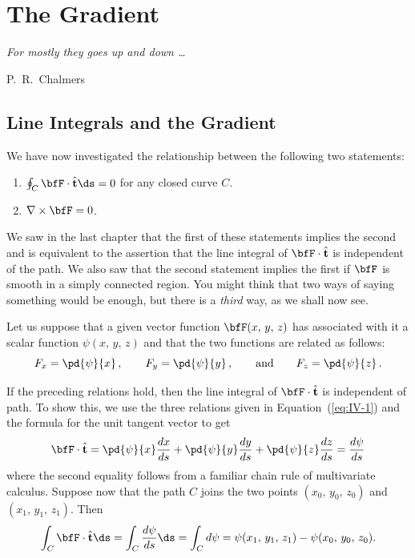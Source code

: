 \chapter{The Gradient}

\epigraph{\textit{For mostly they goes up and down \ldots}}{P.~R.~Chalmers}

\section{Line Integrals and the Gradient}

We have now investigated the relationship between the following
two statements:
\begin{enumerate}
\item $\oint_C \bfF \cdot \hat{\mathbf{t}}\ds = 0$ for any closed curve $C$.
\item $\nabla \times \bfF = 0$.
\end{enumerate}

We saw in the last chapter that the first of these statements implies
the second and is equivalent to the assertion that the line integral
of $\bfF \cdot \hat{\mathbf{t}}$ is independent of the path.  We also saw that the
second statement implies the first if $\bfF$ is smooth in a simply
connected region.  You might think that two ways of saying
something would be enough, but there is a \emph{third} way, as we
shall now see.

Let us suppose that a given vector function $\bfF(x,\,y,\,z)$ has associated
with it a scalar function $\psi(x,\,y,\,z)$ and that the two functions
are related as follows:
\begin{equation}
F_x = \pd{\psi}{x}\,,\qquad F_y = \pd{\psi}{y}\,,\qquad\text{and}\qquad
F_z = \pd{\psi}{z}\,.
\label{eq:IV-1}
\end{equation}

If the preceding relations hold, then the line integral of
$\bfF \cdot \hat{\mathbf{t}}$ is independent of path.  To show this, we use the
three relations given in Equation~(\ref{eq:IV-1}) and the formula
for the unit tangent vector to get
\[
\bfF \cdot \hat{\mathbf{t}}
= \pd{\psi}{x}\frac{dx}{ds}
+ \pd{\psi}{y}\frac{dy}{ds}
+ \pd{\psi}{z}\frac{dz}{ds}
= \frac{d\psi}{ds}
\]
where the second equality follows from a familiar chain rule of
multivariate calculus.  Suppose now that the path $C$ joins the two
points $(x_0,\,y_0,\,z_0)$ and $(x_1,\,y_1,\,z_1)$.  Then
\[
\int_C \bfF \cdot \hat{\mathbf{t}}\ds
= \int_C \frac{d\psi}{ds}\ds
= \int_C d\psi
= \psi(x_1,\,y_1,\,z_1) - \psi(x_0,\,y_0,\,z_0).
\]

